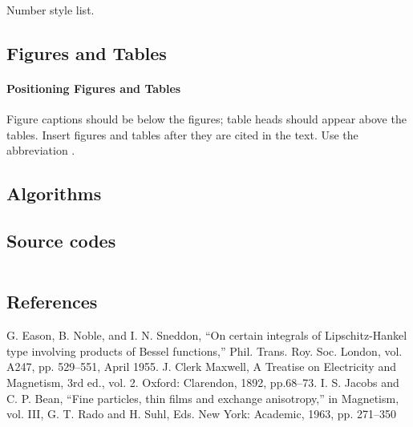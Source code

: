 \documentclass{article}
\begin{document}
Number style list.


\subsection{Figures and Tables}
\paragraph{Positioning Figures and Tables} Figure captions should be below the figures; table heads should appear above the tables. Insert figures and tables after they are cited in the text. Use the abbreviation .

\begin{table}
\begin{center}
%
\end{center}
\end{table}

\begin{figure}

\end{figure}

\subsection{Algorithms}
% 

\subsection{Source codes}
\begin{verbatim}

\end{verbatim}

\subsection{References}


\begin{thebibliography}{00}
 G. Eason, B. Noble, and I. N. Sneddon, ``On certain integrals of Lipschitz-Hankel type involving products of Bessel functions,'' Phil. Trans. Roy. Soc. London, vol. A247, pp. 529--551, April 1955.
 J. Clerk Maxwell, A Treatise on Electricity and Magnetism, 3rd ed., vol. 2. Oxford: Clarendon, 1892, pp.68--73.
 I. S. Jacobs and C. P. Bean, ``Fine particles, thin films and exchange anisotropy,'' in Magnetism, vol. III, G. T. Rado and H. Suhl, Eds. New York: Academic, 1963, pp. 271--350
\end{thebibliography}
\end{document}
